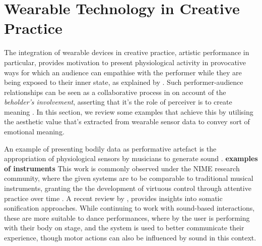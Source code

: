 

\section{Wearable Technology in Creative Practice}%
\label{lit_review:biosignals_creativity}

The integration of wearable devices in creative practice, artistic performance in particular, provides motivation to present physiological activity in provocative ways for which an audience can empathise with the performer while they are being exposed to their inner state, as explained by \citeauthor{francoise_designing_2017} \cite{francoise_designing_2017}. Such performer-audience relationships can be seen as a collaborative process in on account of the \textit{beholder's involvement}, asserting that it's the role of perceiver is to create meaning \cite{kandel_age_2012}. In this section, we review some examples that achieve this by utilising the aesthetic value that's extracted from wearable sensor data to convey sort of emotional meaning. 

An example of presenting bodily data as performative artefact is the appropriation of physiological sensors by musicians to generate sound \cite{aly_appropriating_2021}.
\textbf{examples of instruments}
This work is commonly observed under the NIME research community, where the given systems are to be comparable to traditional musical instruments, granting the the development of virtuous control through attentive practice over time \cite{wu_supporting_2017}. A recent review by \citeauthor{giomi_somatic_2020}, provides insights into somatic sonification approaches. While continuing to work with sound-based interactions, these are more suitable to dance performances, where by the user is performing with their body on stage, and the system is used to better communicate their experience, though motor actions can also be influenced by sound in this context.

